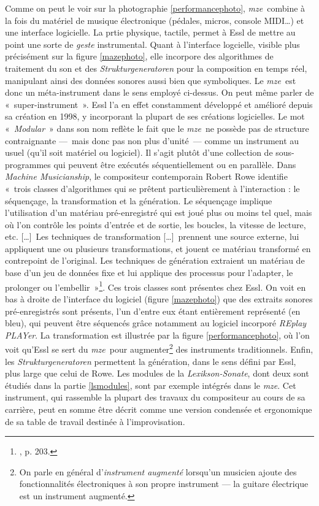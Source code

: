 \documentclass[a4paper,12pt]{article}
\newcommand{\guill}[1]{«~#1~»}
\newcommand{\maze}[0]{\emph{m\symbol{64}ze\textdegree2}}
\newcommand{\tpp}[0]{[\dots]}
\begin{document}
Comme on peut le voir sur la photographie \ref{performancephoto}, \maze~combine à la fois du matériel de musique électronique (pédales, micros, console MIDI\dots) et une interface logicielle. La prtie physique, tactile, permet à Essl de mettre au point une sorte de \emph{geste} instrumental. Quant à l'interface logcielle, visible plus précisément sur la figure \ref{mazephoto}, elle incorpore des algorithmes de traitement du son et des \emph{Strukturgeneratoren} pour la composition en temps réel, manipulant ainsi des données sonores aussi bien que symboliques. Le \maze~est donc un méta-instrument dans le sens employé ci-dessus. On peut même parler de \guill{super-instrument}. Essl l'a en effet constamment développé et amélioré depuis sa création en 1998, y incorporant la plupart de ses créations logicielles. Le mot \guill{\emph{Modular}} dans son nom reflète le fait que le \maze~ne possède pas de structure contraignante ---~mais donc pas non plus d'unité~--- comme un instrument au usuel (qu'il soit matériel ou logiciel). Il s'agit plutôt d'une collection de sous-programmes qui peuvent être exécutés séquentiellement ou en parallèle. Dans \emph{Machine Musicianship}, le compositeur contemporain Robert Rowe identifie \guill{trois classes d'algorithmes qui se prêtent particulièrement à l'interaction : le séquençage, la transformation et la génération. Le séquençage implique l'utilisation d'un matériau pré-enregistré qui est joué plus ou moins tel quel, mais où l'on contrôle les points d'entrée et de sortie, les boucles, la vitesse de lecture, etc. \tpp~Les techniques de transformation \tpp~prennent une source externe, lui appliquent une ou plusieurs transformations, et jouent ce matériau transformé en contrepoint de l'original. Les techniques de génération extraient un matériau de base d'un jeu de données fixe et lui applique des processus pour l'adapter, le prolonger ou l'embellir}\footnote{\cite{machinemusicianship}, p. 203.}. Ces trois classes sont présentes chez Essl. On voit en bas à droite de l'interface du logiciel (figure \ref{mazephoto}) que des extraits sonores pré-enregistrés sont présents, l'un d'entre eux étant entièrement représenté (en bleu), qui peuvent être séquencés grâce notamment au logiciel incorporé \emph{REplay PLAYer}. La transformation est illustrée par la figure \ref{performancephoto}, où l'on voit qu'Essl se sert du \maze~pour augmenter\footnote{On parle en général d'\emph{instrument augmenté} lorsqu'un musicien ajoute des fonctionnalités électroniques à son propre instrument --- la guitare électrique est un instrument augmenté.} des instruments traditionnels. Enfin, les \emph{Strukturgeneratoren} permettent la génération, dans le sens défini par Essl, plus large que celui de Rowe. Les modules de la \emph{Lexikson-Sonate}, dont deux sont étudiés dans la partie \ref{lsmodules}, sont par exemple intégrés dans le \maze. Cet instrument, qui rassemble la plupart des travaux du compositeur au cours de sa carrière, peut en somme être décrit comme une version condensée et ergonomique de sa table de travail destinée à l'improvisation.
\end{document}
